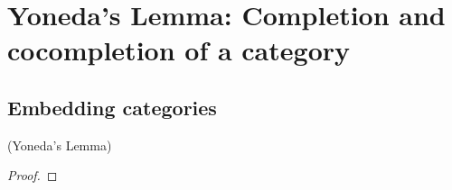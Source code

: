 
\section{Yoneda's Lemma: Completion and cocompletion of a category}

\subsection{Embedding categories}

\begin{lemma}{(Yoneda's Lemma)}

\begin{proof}

\end{proof}
\end{lemma}

